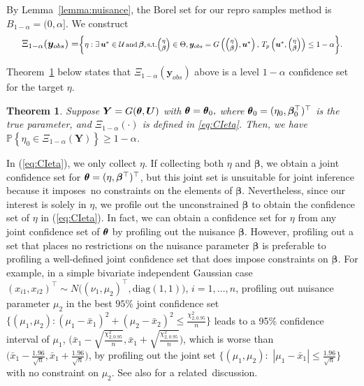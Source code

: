 \documentclass[12pt]{article}
\theoremstyle{shortspace}
\newtheorem{theorem}{Theorem}
\def\*#1{\bm{#1}}
\def\btheta{\mathop{\theta\kern-.45em\hbox{$\theta$}}\nolimits}
\def\P{\mathbb P}
\begin{document}
 By Lemma~\ref{lemma:nuisance}, the Borel set for our repro samples method is 
$B_{1 -\alpha} =(0, \alpha]$.  
We construct 
\begin{equation}
\label{eq:CIeta}
{\small \Xi_{1 -\alpha}(\*y_{obs}) = }\resizebox{.785\textwidth}{!}{${\small \bigg\{\eta: \exists \, \*u^* \in {\mathcal U} \, \text{and} \, \*\beta, 
\text{s.t.}  {\footnotesize \begin{pmatrix}\eta  \\ \*\beta
\end{pmatrix}}\in \Theta,  \*y_{obs} = 
G\left({\footnotesize \begin{pmatrix}\eta \\ \*\beta
\end{pmatrix}}, \*u^*\right),
\,
T_p\left(\*u^*, {\footnotesize \begin{pmatrix}\eta \\ \*\beta
\end{pmatrix}}\right) \leq 1 - \alpha   \bigg\}.} 
$}
\end{equation}

\noindent
Theorem~\ref{the:nuisance} below states that $\Xi_{1 -\alpha}(\*y_{obs})$ above
is a level $1 - \alpha$ confidence set for the target $\eta$.
\begin{theorem}\label{the:nuisance}
Suppose $\*Y = G(\btheta, \*U)$ with $\btheta = \btheta_0,$ where $\btheta_0 = (\eta_0, \*\beta_0^\top)^\top$ is the true parameter, and $\Xi_{1 -\alpha}(\cdot)$ is defined in \eqref{eq:CIeta}. Then,  we have $\P\left\{\eta_0 \in \Xi_{1 -\alpha}(\*Y)\right\} \ge 1 - \alpha$. 
\end{theorem}

In (\ref{eq:CIeta}), we only collect $\eta$. 
If collecting both $\eta$ and $\*\beta$, we obtain a joint confidence set for $\btheta = (\eta, \*\beta^\top)^\top$, but this joint set is unsuitable for joint inference because it imposes~no constraints on the elements of $\*\beta$. Nevertheless, since our interest is solely in $\eta$, we profile out the unconstrained
$\*\beta$ to obtain the confidence set of $\eta$ in (\ref{eq:CIeta}). In fact, we can obtain a confidence set for $\eta$ from any joint confidence set of $\btheta$ by profiling out the nuisance $\*\beta$. However, profiling out a set that places no restrictions on the nuisance parameter $\*\beta$ is preferable to profiling a well-defined joint confidence set that does impose constraints on $\*\beta$. For example, in a simple bivariate independent Gaussian case $(x_{i1},x_{i2})^\top \sim N\big((\nu_1, \mu_2)^\top, \text{diag}(1,1)\big)$, $i = 1, \ldots,n$,  profiling out nuisance parameter $\mu_2$ in the best $95\%$ joint confidence set $\big\{ (\mu_1, \mu_2): (\mu_1 - \bar{x}_1)^2 + (\mu_2 - \bar{x}_2)^2 \le \frac{\chi^2_{2,0.95}}{n} \big\}$ leads to a 95\% confidence interval of $\mu_1$, $\big( \bar{x}_1 - \sqrt{\frac{\chi^2_{2,0.95}}{n}}, \bar{x}_1 + \sqrt{\frac{\chi^2_{2,0.95}}{n}} \big)$, which is worse than $\big( \bar{x}_1 - \frac{1.96}{\sqrt{n}}, \bar{x}_1 + \frac{1.96}{\sqrt{n}} \big)$, 
by profiling out the joint set $\{ (\mu_1, \mu_2): $ $ |\mu_1 - \bar{x}_1| \le \frac{1.96}{\sqrt{n}} \}$ with no constraint on $\mu_2$. See also \cite{Michael2019} for a related~discussion. 
 
\end{document}
